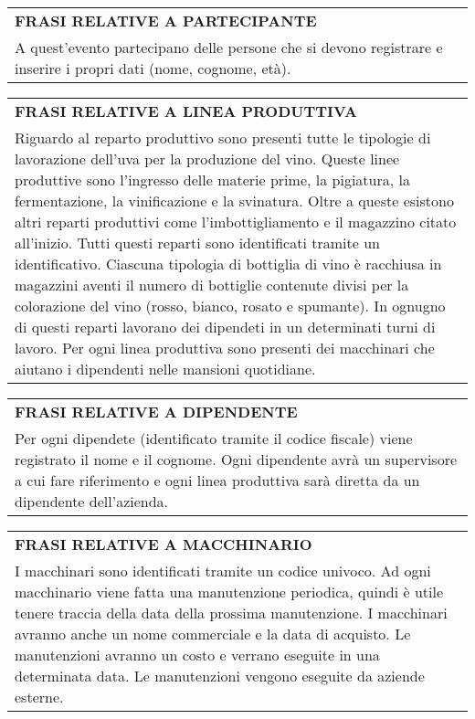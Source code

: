 \begin{center}
	\vspace{0.5cm}
	
	\begin{tabular}{P{16cm}}
		\toprule
		 \textbf {\large {FRASI RELATIVE A PARTECIPANTE}} \\
		A quest'evento partecipano delle persone che si devono registrare e inserire i propri dati (nome, cognome, età).\\
		\bottomrule
	\end{tabular}
	
	\vspace{0.5cm}
	
	\begin{tabular}{P{16cm}}
		\toprule
		 \textbf {\large {FRASI RELATIVE A LINEA PRODUTTIVA}} \\
		Riguardo al reparto produttivo sono presenti tutte le tipologie di lavorazione dell'uva per la produzione del vino. Queste linee produttive sono l'ingresso delle materie prime, la pigiatura, la fermentazione, la vinificazione e la svinatura. Oltre a queste esistono altri reparti produttivi come l'imbottigliamento e il magazzino citato all'inizio. Tutti questi reparti sono identificati tramite un identificativo. Ciascuna tipologia di bottiglia di vino è racchiusa in magazzini aventi il numero di bottiglie contenute divisi per la colorazione del vino (rosso, bianco, rosato e spumante). In ognugno di questi reparti lavorano dei dipendeti in un determinati turni di lavoro. Per ogni linea produttiva sono presenti dei macchinari che aiutano i dipendenti nelle mansioni quotidiane.\\
		\bottomrule
	\end{tabular}
	
	\vspace{0.5cm}
	
	\begin{tabular}{P{16cm}}
		\toprule
		 \textbf {\large {FRASI RELATIVE A DIPENDENTE}} \\
		Per ogni dipendete (identificato tramite il codice fiscale) viene registrato il nome e il cognome. Ogni dipendente avrà un supervisore a cui fare riferimento e ogni linea produttiva sarà diretta da un dipendente dell'azienda.\\
		\bottomrule
	\end{tabular}
	
	\vspace{0.5cm}
	
	\begin{tabular}{P{16cm}}
		\toprule
		 \textbf {\large {FRASI RELATIVE A MACCHINARIO}} \\
		I macchinari sono identificati tramite un codice univoco. Ad ogni macchinario viene fatta una manutenzione periodica, quindi è utile tenere traccia della data della prossima manutenzione. I macchinari avranno anche un nome commerciale e la data di acquisto. Le manutenzioni avranno un costo e verrano eseguite in una determinata data. Le manutenzioni vengono eseguite da aziende esterne.\\
		\bottomrule
	\end{tabular}
	
\end{center}